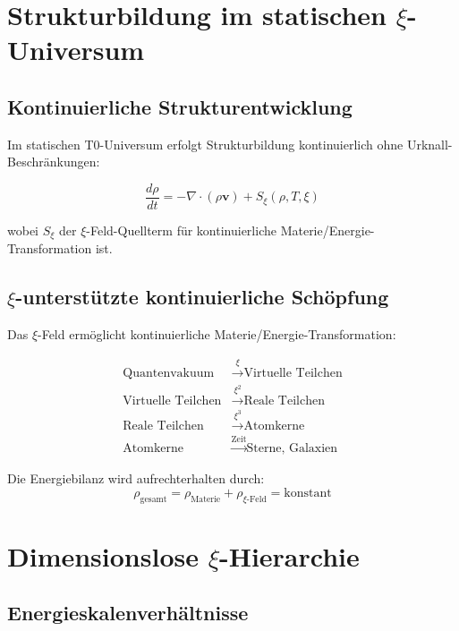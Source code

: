 \documentclass[12pt,a4paper]{article}
\begin{document}
	\section{Strukturbildung im statischen $\xi$-Universum}
	
	\subsection{Kontinuierliche Strukturentwicklung}
	
	Im statischen T0-Universum erfolgt Strukturbildung kontinuierlich ohne Urknall-Beschränkungen:
	
	\begin{equation}
		\frac{d\rho}{dt} = -\nabla \cdot (\rho \mathbf{v}) + S_\xi(\rho, T, \xi)
	\end{equation}
	
	wobei $S_\xi$ der $\xi$-Feld-Quellterm für kontinuierliche Materie/Energie-Transformation ist.
	
	\subsection{$\xi$-unterstützte kontinuierliche Schöpfung}
	
	Das $\xi$-Feld ermöglicht kontinuierliche Materie/Energie-Transformation:
	
	\begin{align}
		\text{Quantenvakuum} &\xrightarrow{\xi} \text{Virtuelle Teilchen} \\
		\text{Virtuelle Teilchen} &\xrightarrow{\xi^2} \text{Reale Teilchen} \\
		\text{Reale Teilchen} &\xrightarrow{\xi^3} \text{Atomkerne} \\
		\text{Atomkerne} &\xrightarrow{\text{Zeit}} \text{Sterne, Galaxien}
	\end{align}
	
	Die Energiebilanz wird aufrechterhalten durch:
	\begin{equation}
		\rho_{\text{gesamt}} = \rho_{\text{Materie}} + \rho_{\xi\text{-Feld}} = \text{konstant}
	\end{equation}
	
	\section{Dimensionslose $\xi$-Hierarchie}
	
	\subsection{Energieskalenverhältnisse}
	
\end{document}

